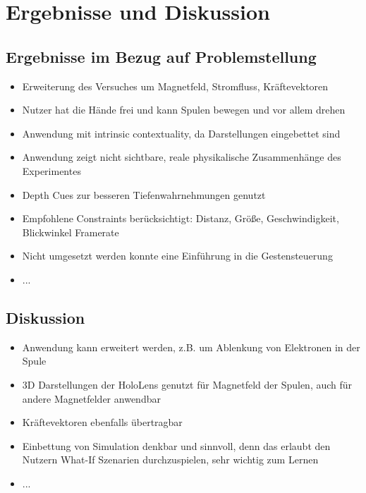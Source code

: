 \section{Ergebnisse und Diskussion}
\label{sec-6}

\subsection{Ergebnisse im Bezug auf Problemstellung}
\begin{itemize}
	\item Erweiterung des Versuches um Magnetfeld, Stromfluss, Kräftevektoren
	\item Nutzer hat die Hände frei und kann Spulen bewegen und vor allem drehen
	\item Anwendung mit intrinsic contextuality, da Darstellungen eingebettet sind
	\item Anwendung zeigt nicht sichtbare, reale physikalische Zusammenhänge des Experimentes
	\item Depth Cues zur besseren Tiefenwahrnehmungen genutzt
	\item Empfohlene Constraints berücksichtigt:
	\subitem Distanz, Größe, Geschwindigkeit, Blickwinkel
	\subitem Framerate
	\item Nicht umgesetzt werden konnte eine Einführung in die Gestensteuerung
	\item ...
\end{itemize}

\subsection{Diskussion}
\begin{itemize}
	\item Anwendung kann erweitert werden, z.B. um Ablenkung von Elektronen in der Spule
	\item 3D Darstellungen der HoloLens genutzt für Magnetfeld der Spulen, auch für andere Magnetfelder anwendbar
	\item Kräftevektoren ebenfalls übertragbar
	\item Einbettung von Simulation denkbar und sinnvoll, denn das erlaubt den Nutzern What-If Szenarien durchzuspielen, sehr wichtig zum Lernen
	\item ...
\end{itemize}
	
	
	
	
	
	
	
	
	
	
	
	
	
	
	